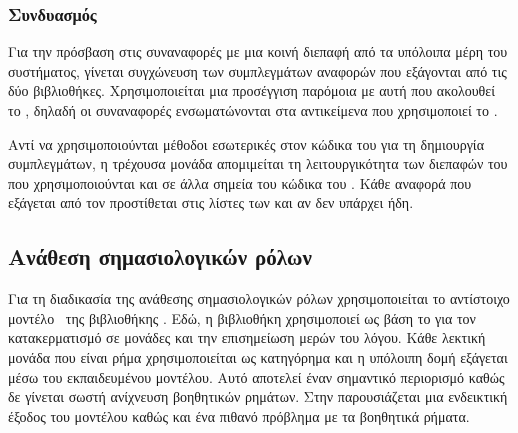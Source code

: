 \subsubsection{Συνδυασμός}\label{subsec:4-coref-combine}
Για την πρόσβαση στις συναναφορές με μια κοινή διεπαφή από τα υπόλοιπα μέρη του συστήματος, γίνεται συγχώνευση των συμπλεγμάτων αναφορών που εξάγονται από τις δύο βιβλιοθήκες.
Χρησιμοποιείται μια προσέγγιση παρόμοια με αυτή που ακολουθεί το , δηλαδή οι συναναφορές ενσωματώνονται στα αντικείμενα που χρησιμοποιεί το .

Αντί να χρησιμοποιούνται μέθοδοι εσωτερικές στον κώδικα του  για τη δημιουργία συμπλεγμάτων,
η τρέχουσα μονάδα απομιμείται τη λειτουργικότητα των διεπαφών του  που χρησιμοποιούνται και σε άλλα σημεία του κώδικα του \projectname{}.
Κάθε αναφορά που εξάγεται από τον  προστίθεται στις λίστες  των  και  αν δεν υπάρχει ήδη.

\subsection{Ανάθεση σημασιολογικών ρόλων}\label{subsec:4-allenSRL}
Για τη διαδικασία της ανάθεσης σημασιολογικών ρόλων χρησιμοποιείται το αντίστοιχο μοντέλο~\cite{he2017deep} της βιβλιοθήκης .
Εδώ, η βιβλιοθήκη χρησιμοποιεί ως βάση το  για τον κατακερματισμό σε μονάδες και την επισημείωση μερών του λόγου.
Κάθε λεκτική μονάδα που είναι ρήμα χρησιμοποιείται ως κατηγόρημα και η υπόλοιπη δομή εξάγεται μέσω του εκπαιδευμένου μοντέλου.
Αυτό αποτελεί έναν σημαντικό περιορισμό καθώς δε γίνεται σωστή ανίχνευση βοηθητικών ρημάτων.
Στην  παρουσιάζεται μια ενδεικτική έξοδος του μοντέλου καθώς και ένα πιθανό πρόβλημα με τα βοηθητικά ρήματα.

